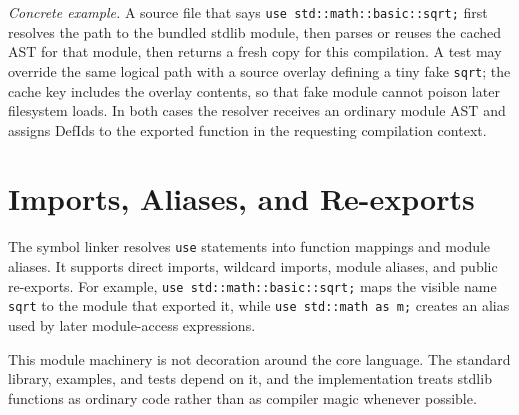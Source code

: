 \textit{Concrete example.} A source file that says \texttt{use
std::math::basic::sqrt;} first resolves the path to the bundled stdlib module,
then parses or reuses the cached AST for that module, then returns a fresh copy
for this compilation. A test may override the same logical path with a source
overlay defining a tiny fake \texttt{sqrt}; the cache key includes the overlay
contents, so that fake module cannot poison later filesystem loads. In both
cases the resolver receives an ordinary module AST and assigns DefIds to the
exported function in the requesting compilation context.

\section{Imports, Aliases, and Re-exports}

The symbol linker resolves \texttt{use} statements into function mappings and
module aliases. It supports direct imports, wildcard imports, module aliases,
and public re-exports. For example, \texttt{use std::math::basic::sqrt;} maps
the visible name \texttt{sqrt} to the module that exported it, while
\texttt{use std::math as m;} creates an alias used by later module-access
expressions.

This module machinery is not decoration around the core language. The standard
library, examples, and tests depend on it, and the implementation treats stdlib
functions as ordinary \einlang{} code rather than as compiler magic whenever
possible.
